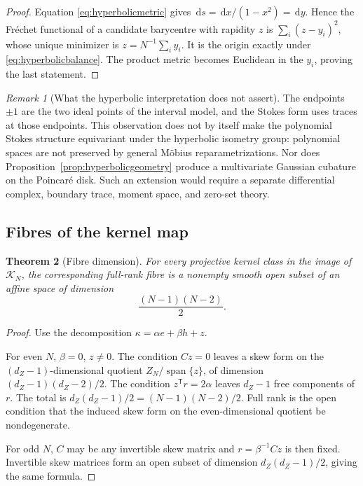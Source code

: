 \documentclass[11pt,a4paper]{article}
\newtheorem{theorem}{Theorem}[section]
\theoremstyle{definition}
\theoremstyle{remark}
\newtheorem{remark}[theorem]{Remark}
\newcommand{\spanof}{\operatorname{span}}
\newcommand{\cK}{\mathcal{K}}
\newcommand{\dd}{\,\mathrm{d}}
\begin{document}
\begin{proof}
Equation \eqref{eq:hyperbolicmetric} gives $\dd s=\dd x/(1-x^2)=\dd y$.  Hence the
Fr\'echet functional of a candidate barycentre with rapidity $z$ is
$\sum_i(z-y_i)^2$, whose unique minimizer is $z=N^{-1}\sum_i y_i$.  It is the origin
exactly under \eqref{eq:hyperbolicbalance}.  The product metric becomes Euclidean in the
$y_i$, proving the last statement.
\end{proof}

\begin{remark}[What the hyperbolic interpretation does not assert]
The endpoints $\pm1$ are the two ideal points of the interval model, and the Stokes form
uses traces at those endpoints.  This observation does not by itself make the polynomial
Stokes structure equivariant under the hyperbolic isometry group: polynomial spaces are not
preserved by general M\"obius reparametrizations.  Nor does
Proposition~\ref{prop:hyperbolicgeometry} produce a multivariate Gaussian cubature on the
Poincar\'e disk.  Such an extension would require a separate differential complex, boundary
trace, moment space, and zero-set theory.
\end{remark}

\subsection{Fibres of the kernel map}

\begin{theorem}[Fibre dimension]\label{thm:fibres}
For every projective kernel class in the image of $\cK_N$, the corresponding full-rank fibre
is a nonempty smooth open subset of an affine space of dimension
\begin{equation}\label{eq:fibredim}
 \boxed{\frac{(N-1)(N-2)}2.}
\end{equation}
\end{theorem}

\begin{proof}
Use the decomposition $\kappa=\alpha e+\beta h+z$.

For even $N$, $\beta=0$, $z\neq0$.  The condition $Cz=0$ leaves a skew form on the
$(d_Z-1)$-dimensional quotient $Z_N/\spanof\{z\}$, of dimension
$(d_Z-1)(d_Z-2)/2$.  The condition $z^{\mathsf T}r=2\alpha$ leaves $d_Z-1$ free components of
$r$.  The total is $d_Z(d_Z-1)/2=(N-1)(N-2)/2$.  Full rank is the open condition that the
induced skew form on the even-dimensional quotient be nondegenerate.

For odd $N$, $C$ may be any invertible skew matrix and $r=\beta^{-1}Cz$ is then fixed.
Invertible skew matrices form an open subset of dimension $d_Z(d_Z-1)/2$, giving the same
formula.
\end{proof}
\end{document}

